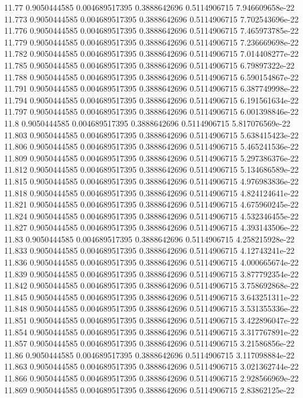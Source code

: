 {11.77 0.9050444585 0.004689517395 0.3888642696 0.5114906715 7.946609658e-22
11.773 0.9050444585 0.004689517395 0.3888642696 0.5114906715 7.702543696e-22
11.776 0.9050444585 0.004689517395 0.3888642696 0.5114906715 7.465973785e-22
11.779 0.9050444585 0.004689517395 0.3888642696 0.5114906715 7.236669698e-22
11.782 0.9050444585 0.004689517395 0.3888642696 0.5114906715 7.014408277e-22
11.785 0.9050444585 0.004689517395 0.3888642696 0.5114906715 6.79897322e-22
11.788 0.9050444585 0.004689517395 0.3888642696 0.5114906715 6.590154867e-22
11.791 0.9050444585 0.004689517395 0.3888642696 0.5114906715 6.387749998e-22
11.794 0.9050444585 0.004689517395 0.3888642696 0.5114906715 6.191561634e-22
11.797 0.9050444585 0.004689517395 0.3888642696 0.5114906715 6.001398846e-22
11.8 0.9050444585 0.004689517395 0.3888642696 0.5114906715 5.817076569e-22
11.803 0.9050444585 0.004689517395 0.3888642696 0.5114906715 5.638415423e-22
11.806 0.9050444585 0.004689517395 0.3888642696 0.5114906715 5.465241536e-22
11.809 0.9050444585 0.004689517395 0.3888642696 0.5114906715 5.297386376e-22
11.812 0.9050444585 0.004689517395 0.3888642696 0.5114906715 5.134686589e-22
11.815 0.9050444585 0.004689517395 0.3888642696 0.5114906715 4.976983836e-22
11.818 0.9050444585 0.004689517395 0.3888642696 0.5114906715 4.824124641e-22
11.821 0.9050444585 0.004689517395 0.3888642696 0.5114906715 4.675960245e-22
11.824 0.9050444585 0.004689517395 0.3888642696 0.5114906715 4.532346455e-22
11.827 0.9050444585 0.004689517395 0.3888642696 0.5114906715 4.393143506e-22
11.83 0.9050444585 0.004689517395 0.3888642696 0.5114906715 4.258215928e-22
11.833 0.9050444585 0.004689517395 0.3888642696 0.5114906715 4.12743241e-22
11.836 0.9050444585 0.004689517395 0.3888642696 0.5114906715 4.000665674e-22
11.839 0.9050444585 0.004689517395 0.3888642696 0.5114906715 3.877792354e-22
11.842 0.9050444585 0.004689517395 0.3888642696 0.5114906715 3.758692868e-22
11.845 0.9050444585 0.004689517395 0.3888642696 0.5114906715 3.643251311e-22
11.848 0.9050444585 0.004689517395 0.3888642696 0.5114906715 3.531355336e-22
11.851 0.9050444585 0.004689517395 0.3888642696 0.5114906715 3.422896047e-22
11.854 0.9050444585 0.004689517395 0.3888642696 0.5114906715 3.317767891e-22
11.857 0.9050444585 0.004689517395 0.3888642696 0.5114906715 3.21586856e-22
11.86 0.9050444585 0.004689517395 0.3888642696 0.5114906715 3.117098884e-22
11.863 0.9050444585 0.004689517395 0.3888642696 0.5114906715 3.021362744e-22
11.866 0.9050444585 0.004689517395 0.3888642696 0.5114906715 2.928566969e-22
11.869 0.9050444585 0.004689517395 0.3888642696 0.5114906715 2.83862125e-22
}
